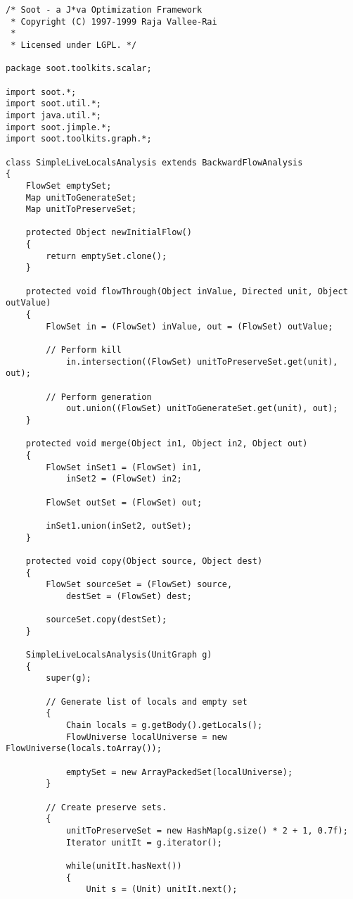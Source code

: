 \documentclass{article}
\begin{document}
\begin{verbatim}
/* Soot - a J*va Optimization Framework
 * Copyright (C) 1997-1999 Raja Vallee-Rai
 *
 * Licensed under LGPL. */

package soot.toolkits.scalar;

import soot.*;
import soot.util.*;
import java.util.*;
import soot.jimple.*;
import soot.toolkits.graph.*;

class SimpleLiveLocalsAnalysis extends BackwardFlowAnalysis
{
    FlowSet emptySet;
    Map unitToGenerateSet;
    Map unitToPreserveSet;

    protected Object newInitialFlow()
    {
        return emptySet.clone();
    }
        
    protected void flowThrough(Object inValue, Directed unit, Object outValue)
    {
        FlowSet in = (FlowSet) inValue, out = (FlowSet) outValue;

        // Perform kill
            in.intersection((FlowSet) unitToPreserveSet.get(unit), out);

        // Perform generation
            out.union((FlowSet) unitToGenerateSet.get(unit), out);
    }

    protected void merge(Object in1, Object in2, Object out)
    {
        FlowSet inSet1 = (FlowSet) in1,
            inSet2 = (FlowSet) in2;

        FlowSet outSet = (FlowSet) out;

        inSet1.union(inSet2, outSet);
    }
    
    protected void copy(Object source, Object dest)
    {
        FlowSet sourceSet = (FlowSet) source,
            destSet = (FlowSet) dest;
            
        sourceSet.copy(destSet);
    }

    SimpleLiveLocalsAnalysis(UnitGraph g)
    {
        super(g);

        // Generate list of locals and empty set
        {
            Chain locals = g.getBody().getLocals();
            FlowUniverse localUniverse = new FlowUniverse(locals.toArray());

            emptySet = new ArrayPackedSet(localUniverse);            
        }

        // Create preserve sets.
        {
            unitToPreserveSet = new HashMap(g.size() * 2 + 1, 0.7f);
            Iterator unitIt = g.iterator();

            while(unitIt.hasNext())
            {
                Unit s = (Unit) unitIt.next();


\end{verbatim}
\end{document}

